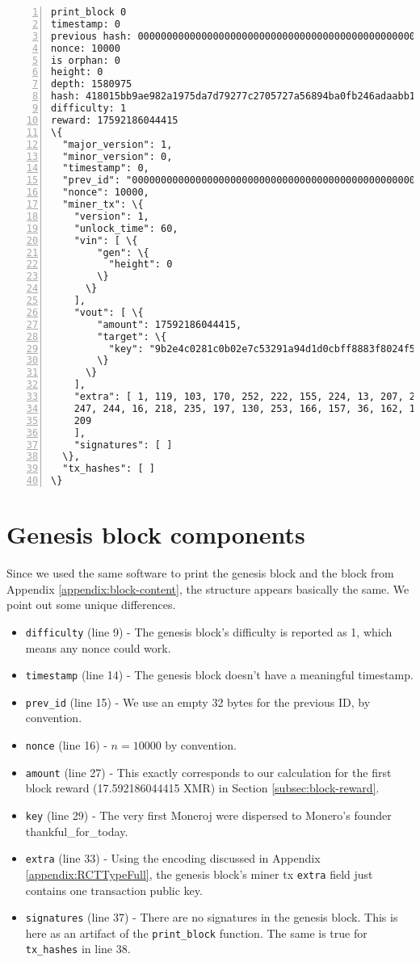 \begin{appendices}
\begin{Verbatim}[commandchars=\\\{\}, numbers=left]
print_block 0
timestamp: 0
previous hash: 0000000000000000000000000000000000000000000000000000000000000000
nonce: 10000
is orphan: 0
height: 0
depth: 1580975
hash: 418015bb9ae982a1975da7d79277c2705727a56894ba0fb246adaabb1f4632e3
difficulty: 1
reward: 17592186044415
\{
  "major_version": 1,
  "minor_version": 0,
  "timestamp": 0,
  "prev_id": "0000000000000000000000000000000000000000000000000000000000000000",
  "nonce": 10000,
  "miner_tx": \{
    "version": 1,
    "unlock_time": 60,
    "vin": [ \{
        "gen": \{
          "height": 0
        \}
      \}
    ],
    "vout": [ \{
        "amount": 17592186044415,
        "target": \{
          "key": "9b2e4c0281c0b02e7c53291a94d1d0cbff8883f8024f5142ee494ffbbd088071"
        \}
      \}
    ],
    "extra": [ 1, 119, 103, 170, 252, 222, 155, 224, 13, 207, 208, 152, 113, 94, 188, 
    247, 244, 16, 218, 235, 197, 130, 253, 166, 157, 36, 162, 142, 157, 11, 200, 144, 
    209
    ],
    "signatures": [ ]
  \},
  "tx_hashes": [ ]
\}
\end{Verbatim}


\section*{Genesis block components}

Since we used the same software to print the genesis block and the block from Appendix \ref{appendix:block-content}, the structure appears basically the same. We point out some unique differences.

\begin{itemize}
	\item {\tt difficulty} (line 9) - The genesis block's difficulty is reported as 1, which means any nonce could work.
	\item {\tt timestamp} (line 14) - The genesis block doesn't have a meaningful timestamp.
	\item {\tt prev\_id} (line 15) - We use an empty 32 bytes for the previous ID, by convention.
	\item {\tt nonce} (line 16) - $n = 10000$ by convention.
	\item {\tt amount} (line 27) - This exactly corresponds to our calculation for the first block reward (17.592186044415 XMR) in Section \ref{subsec:block-reward}.
	\item {\tt key} (line 29) - The very first Moneroj were dispersed to Monero's founder thankful\_for\_today.
	\item {\tt extra} (line 33) - Using the encoding discussed in Appendix \ref{appendix:RCTTypeFull}, the genesis block's miner tx {\tt extra} field just contains one transaction public key.
	\item {\tt signatures} (line 37) - There are no signatures in the genesis block. This is here as an artifact of the {\tt print\_block} function. The same is true for {\tt tx\_hashes} in line 38.
\end{itemize}


\end{appendices}